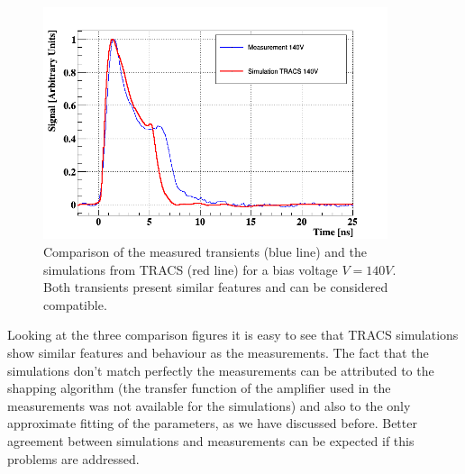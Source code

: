 \begin{figure}[H]
	\centering
	\includegraphics[width=0.9\textwidth]{140V.png}
	\caption{Comparison of the measured transients (blue line) and the simulations from TRACS (red line) for a bias voltage $V = 140V$. Both transients present similar features and can be considered compatible.}
	\label{fig:140v}
\end{figure}

Looking at the three comparison figures it is easy to see that TRACS simulations show similar features and behaviour as the measurements. The fact that the simulations don't match perfectly the measurements can be attributed to the shapping algorithm (the transfer function of the amplifier used in the measurements was not available for the simulations) and also to the only approximate fitting of the parameters, as we have discussed before. Better agreement between simulations and measurements can be expected if this problems are addressed.


